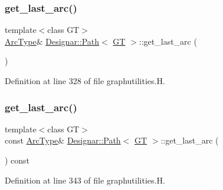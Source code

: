 \subsubsection{\texorpdfstring{get\+\_\+last\+\_\+arc()}{get\_last\_arc()}\hspace{0.1cm}{\footnotesize\ttfamily [1/2]}}
{\footnotesize\ttfamily template$<$class GT$>$ \\
\hyperlink{class_designar_1_1_path_a6e13966351659cedcf3233098b2b7384}{Arc\+Type}\& \hyperlink{class_designar_1_1_path}{Designar\+::\+Path}$<$ \hyperlink{demo-buildgraph_8_c_a3001c40d2c31ca87ed96cd7d1334a55e}{GT} $>$\+::get\+\_\+last\+\_\+arc (\begin{DoxyParamCaption}{ }\end{DoxyParamCaption})\hspace{0.3cm}{\ttfamily [inline]}}



Definition at line 328 of file graphutilities.\+H.

\mbox{\label{class_designar_1_1_path_a3766fdd25ef3f12780a96319e0b7807e}} 
\subsubsection{\texorpdfstring{get\+\_\+last\+\_\+arc()}{get\_last\_arc()}\hspace{0.1cm}{\footnotesize\ttfamily [2/2]}}
{\footnotesize\ttfamily template$<$class GT$>$ \\
const \hyperlink{class_designar_1_1_path_a6e13966351659cedcf3233098b2b7384}{Arc\+Type}\& \hyperlink{class_designar_1_1_path}{Designar\+::\+Path}$<$ \hyperlink{demo-buildgraph_8_c_a3001c40d2c31ca87ed96cd7d1334a55e}{GT} $>$\+::get\+\_\+last\+\_\+arc (\begin{DoxyParamCaption}{ }\end{DoxyParamCaption}) const\hspace{0.3cm}{\ttfamily [inline]}}



Definition at line 343 of file graphutilities.\+H.

\mbox{\label{class_designar_1_1_path_aff47c35e439520a807f2a83119a7937b}} 
